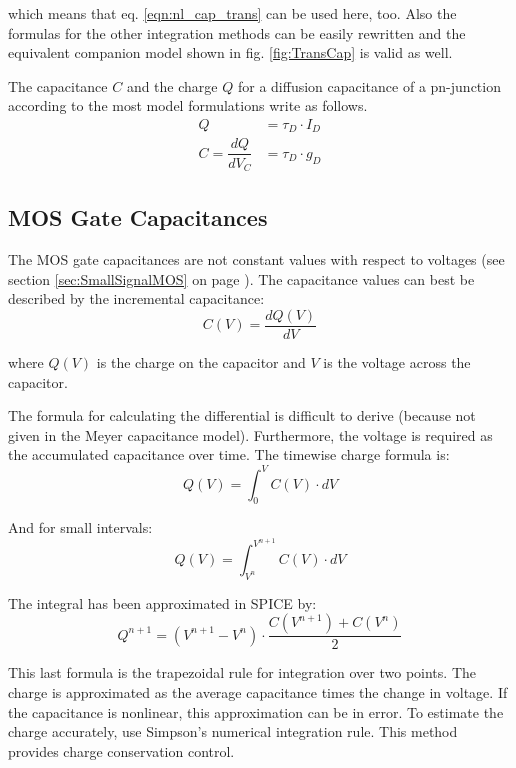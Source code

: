 which means that eq. \eqref{eqn:nl_cap_trans} can be used here, too.
Also the formulas for the other integration methods can be
easily rewritten and the equivalent companion model shown in
fig. \ref{fig:TransCap} is valid as well.

\addvspace{12pt}

The capacitance $C$ and the charge $Q$ for a diffusion capacitance of
a pn-junction according to the most model formulations write as
follows.
\begin{align}
Q &= \tau_D\cdot I_D\\
C = \dfrac{d Q}{d V_C} &= \tau_D\cdot g_D
\end{align}

\subsection{MOS Gate Capacitances}

The MOS gate capacitances are not constant values with respect to
voltages (see section \ref{sec:SmallSignalMOS} on page
\pageref{sec:SmallSignalMOS}). The capacitance values can best be
described by the incremental capacitance:
\begin{equation}
C(V) = \dfrac{d Q(V)}{d V}
\end{equation}

where $Q(V)$ is the charge on the capacitor and $V$ is the voltage
across the capacitor.

\addvspace{12pt}

The formula for calculating the differential is difficult to derive
(because not given in the Meyer capacitance model).  Furthermore, the
voltage is required as the accumulated capacitance over time.  The
timewise charge formula is:
\begin{equation}
Q(V) = \int^{V}_{0} C(V)\cdot dV
\end{equation}

And for small intervals:
\begin{equation}
Q(V) = \int^{V^{n+1}}_{V^{n}} C(V)\cdot dV
\end{equation}

The integral has been approximated in SPICE by:
\begin{equation}
Q^{n+1} = \left(V^{n+1} - V^{n}\right)\cdot \dfrac{C(V^{n+1}) + C(V^{n})}{2}
\end{equation}

This last formula is the trapezoidal rule for integration over two
points.  The charge is approximated as the average capacitance times
the change in voltage.  If the capacitance is nonlinear, this
approximation can be in error.  To estimate the charge accurately, use
Simpson's numerical integration rule.  This method provides charge
conservation control.

